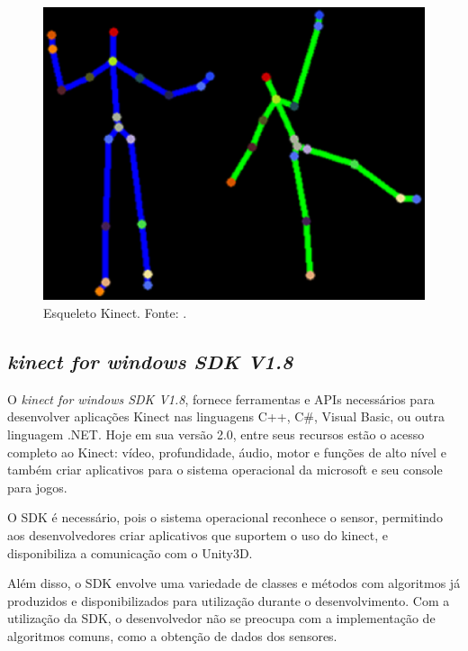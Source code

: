    \begin{figure}[H]
    \centering
    \includegraphics [keepaspectratio=true,scale=0.60]{figuras/esqueletoKinect.eps}
    \caption{Esqueleto Kinect. Fonte: \cite{microsoftResearch}.}

    \label{esqueletokinect}
    \end{figure}

    \subsection{\textit{kinect for windows SDK V1.8 }}\label{sub:sdk}
      O \textit{kinect for windows SDK V1.8}, fornece ferramentas e APIs necessários para desenvolver
    aplicações Kinect nas linguagens  C++, C\#, Visual Basic, ou outra linguagem .NET. Hoje em sua versão 2.0,
    entre seus recursos estão o acesso completo ao Kinect: vídeo,
    profundidade, áudio, motor e funções de alto nível e também  criar aplicativos
    para o sistema operacional da microsoft e seu console para jogos.

     O SDK é necessário, pois o sistema operacional reconhece o sensor, permitindo aos
     desenvolvedores criar aplicativos que suportem o uso do kinect, e disponibiliza a comunicação com o Unity3D.

      Além disso, o SDK envolve uma variedade
    de classes e métodos com algoritmos já produzidos e disponibilizados para utilização
    durante o desenvolvimento. Com a utilização da SDK, o desenvolvedor não se preocupa
    com a implementação de algoritmos comuns, como a obtenção de dados dos
    sensores.

